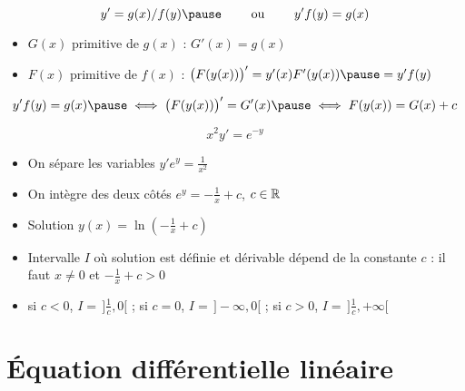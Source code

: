 \begin{frame}

\pause
$$y'=g(x)/f(y) \pause\qquad \text{ ou } \qquad y'f(y)=g(x)$$
\pause
\vspace*{-3ex}
\begin{itemize}
  \item $G(x)$ primitive de $g(x)$ \pause : $G'(x)=g(x)$
  \pause
  \item $F(x)$ primitive de $f(x)$ \pause : $\big(F(y(x))\big)' = y'(x) F'(y(x)) \pause = y' f(y)$
\end{itemize}
\pause
$$y'f(y)=g(x)
\pause
\iff \big(F(y(x))\big)' = G'(x)
\pause
\iff F(y(x))=G(x)+c$$

\pause
\vspace*{-2ex}

\begin{exemple}

$$x^2y' = e^{-y}$$
\pause\vspace*{-3ex}
\begin{itemize}
  \item On sépare les variables $y'e^{y} = \frac{1}{x^2}$
  \pause
  \item On intègre des deux côtés $e^{y} = -\frac{1}{x}+c$, $c\in\mathbb{R}$
  \pause
  \item Solution $y(x) = \ln\left(-\frac{1}{x}+c\right)$
  \pause
  \item Intervalle $I$ où solution est définie et dérivable dépend de la constante $c$ :
  il faut $x\neq0$ et $-\frac{1}{x}+c>0$
  \pause
  \item si $c<0$, $I=\,]\frac1c,0[$  ;  si $c=0$, $I=\,]-\infty,0[$ ;  si $c>0$, $I=\,]\frac1c,+\infty[$
\end{itemize}

\end{exemple}

\end{frame}



\section*{\'Equation différentielle linéaire}



